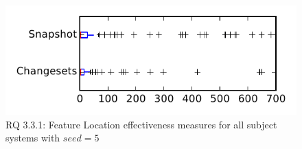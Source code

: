 
\begin{figure}
\centering
\includegraphics[height=0.4\textheight]{figures/flt_seed/rq1_tiny_5}
\caption{RQ 3.3.1: Feature Location effectiveness measures for all subject systems with $seed=5$}
\label{fig:flt_seed:rq1:tiny}
\end{figure}
